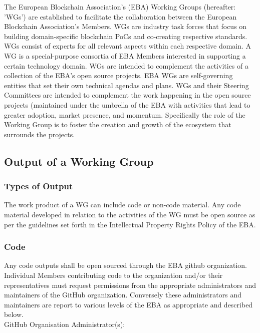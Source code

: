 \documentclass{article}
\begin{document}
The European Blockchain Association's (EBA) Working Groups (hereafter: 'WGs') are established to facilitate the collaboration between the European Blockchain Association's Members. 
WGs are industry task forces that focus on building domain-specific blockchain PoCs and co-creating respective standards. 
WGs consist of experts for all relevant aspects within each respective domain. 
A WG is a special-purpose consortia of EBA Members interested in supporting a certain technology domain. 
WGs are intended to complement the activities of a collection of the EBA's open source projects. 
EBA WGs are self-governing entities that set their own technical agendas and plans. 
WGs and their Steering Committees are intended to complement the work happening in the open source projects (maintained under the umbrella of the EBA  with activities that lead to greater adoption, market presence, and momentum. Specifically the role of the Working Group is to foster the creation and growth of the ecosystem that surrounds the projects.

\subsection{Output of a Working Group}

\subsubsection{Types of Output}

The work product of a WG can include code or non-code material. 
Any code material developed in relation to the activities of the WG must be open source as per the guidelines set forth in the Intellectual Property Rights Policy of the EBA.

\subsubsection{Code}

Any code outputs shall be open sourced through the EBA github organization. 
Individual Members contributing code to the organization and/or their representatives must request permissions from the appropriate administrators and maintainers of the GitHub organization. 
Conversely these administrators and maintainers are report to various levels of the EBA as appropriate and described below. \\

GitHub Organisation Administrator(s): \\
\end{document}
